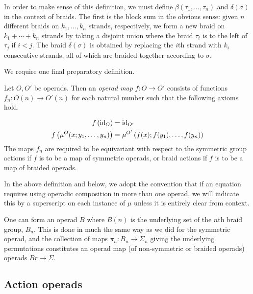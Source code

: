 In order to make sense of this definition, we must define $\beta(\tau_1,\ldots,\tau_n)$ and $\delta(\sigma)$ in the context of braids. The first is the block sum in the obvious sense:  given $n$ different braids on $k_{1}, \ldots, k_{n}$ strands, respectively, we form a new braid on $k_{1} + \cdots + k_{n}$ strands by taking a disjoint union where the braid $\tau_{i}$ is to the left of $\tau_{j}$ if $i < j$. The braid $\delta(\sigma)$ is obtained by replacing the $i$th strand with $k_{i}$ consecutive strands, all of which are braided together according to $\sigma$.

We require one final preparatory definition.

\begin{Defi}\label{Defi:op_map}
Let $O,O'$ be operads. Then an \textit{operad map} $f \colon O \rightarrow O'$ consists of functions $f_{n} \colon O(n) \rightarrow O'(n)$ for each natural number such that the following axioms hold.

  \begin{align*}
    f\left(\textrm{id}_O\right) &= \textrm{id}_{O'}\\
    f\left(\mu^{O}(x;y_1,\ldots,y_n)\right) &= \mu^{O'}\left(f(x);f(y_1),\ldots,f(y_n)\right)
  \end{align*}
The maps $f_{n}$ are required to be equivariant with respect to the symmetric group actions if $f$ is to be a map of symmetric operads, or braid actions if $f$ is to be a map of braided operads.
\end{Defi}

\begin{conv}
In the above definition and below, we adopt the convention that if an equation requires using operadic composition in more than one operad, we will indicate this by a superscript on each instance of $\mu$ unless it is entirely clear from context.
\end{conv}

\begin{example}
One can form an operad $B$ where $B(n)$ is the underlying set of the $n$th braid group, $B_{n}$. This is done in much the same way as we did for the symmetric operad, and the collection of maps $\pi_{n} \colon B_{n} \rightarrow \Sigma_{n}$ giving the underlying permutations constitutes an operad map (of non-symmetric or braided operads) operads $Br \rightarrow \Sigma$.
\end{example}

\subsection{Action operads}

